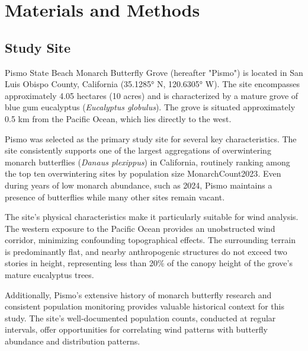 \section{Materials and Methods}
\subsection{Study Site}
Pismo State Beach Monarch Butterfly Grove (hereafter "Pismo") is located in San Luis Obispo County, California (35.1285° N, 120.6305° W). The site encompasses approximately 4.05 hectares (10 acres) and is characterized by a mature grove of blue gum eucalyptus (\textit{Eucalyptus globulus}). The grove is situated approximately 0.5 km from the Pacific Ocean, which lies directly to the west.

Pismo was selected as the primary study site for several key characteristics. The site consistently supports one of the largest aggregations of overwintering monarch butterflies (\textit{Danaus plexippus}) in California, routinely ranking among the top ten overwintering sites by population size {MonarchCount2023}. Even during years of low monarch abundance, such as 2024, Pismo maintains a presence of butterflies while many other sites remain vacant.

The site's physical characteristics make it particularly suitable for wind analysis. The western exposure to the Pacific Ocean provides an unobstructed wind corridor, minimizing confounding topographical effects. The surrounding terrain is predominantly flat, and nearby anthropogenic structures do not exceed two stories in height, representing less than 20\% of the canopy height of the grove's mature eucalyptus trees.

Additionally, Pismo's extensive history of monarch butterfly research and consistent population monitoring provides valuable historical context for this study. The site's well-documented population counts, conducted at regular intervals, offer opportunities for correlating wind patterns with butterfly abundance and distribution patterns.


